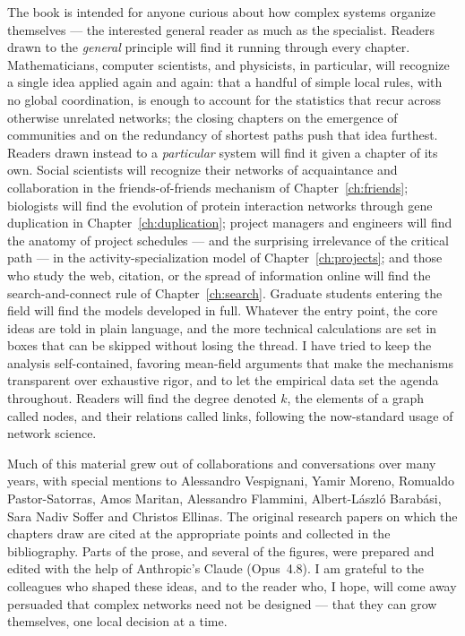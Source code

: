 \documentclass[10pt]{book}
\begin{document}
The book is intended for anyone curious about how complex systems organize 
themselves --- the interested general reader as much as the specialist. 
Readers drawn to the \emph{general} principle will find it running through 
every chapter. Mathematicians, computer scientists, and physicists, in 
particular, will recognize a single idea applied again and again: that a 
handful of simple local rules, with no global coordination, is enough to 
account for the statistics that recur across otherwise unrelated networks; 
the closing chapters on the emergence of communities and on the redundancy of 
shortest paths push that idea furthest. Readers drawn instead to a 
\emph{particular} system will find it given a chapter of its own. Social 
scientists will recognize their networks of acquaintance and collaboration in 
the friends-of-friends mechanism of Chapter~\ref{ch:friends}; biologists will 
find the evolution of protein interaction networks through gene duplication 
in Chapter~\ref{ch:duplication}; project managers and engineers will find the 
anatomy of project schedules --- and the surprising irrelevance of the 
critical path --- in the activity-specialization model of 
Chapter~\ref{ch:projects}; and those who study the web, citation, or the 
spread of information online will find the search-and-connect rule of 
Chapter~\ref{ch:search}. Graduate students entering the field will find the 
models developed in full. Whatever the entry point, the core ideas are told 
in plain language, and the more technical calculations are set in boxes that 
can be skipped without losing the thread. I have tried to keep the analysis 
self-contained, favoring mean-field arguments that make the mechanisms 
transparent over exhaustive rigor, and to let the empirical data set the 
agenda throughout. Readers will find the degree denoted $k$, the elements of 
a graph called nodes, and their relations called links, following the 
now-standard usage of network science.

Much of this material grew out of collaborations and conversations over many 
years, with special mentions to Alessandro Vespignani, Yamir Moreno, Romualdo 
Pastor-Satorras, Amos Maritan, Alessandro Flammini, Albert-L\'aszl\'o 
Barab\'asi, Sara Nadiv Soffer and Christos Ellinas. The original research 
papers on which the chapters draw are cited at the appropriate points and 
collected in the bibliography. Parts of the prose, and several of the 
figures, were prepared and edited with the help of Anthropic's Claude 
(Opus~4.8). I am grateful to the colleagues who shaped these ideas, and to 
the reader who, I hope, will come away persuaded that complex networks need 
not be designed --- that they can grow themselves, one local decision at a
time.
\end{document}
